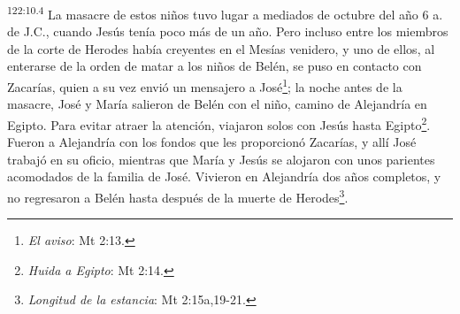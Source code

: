 \par 
\textsuperscript{122:10.4} La masacre de estos niños tuvo lugar a mediados de octubre del año 6 a. de J.C., cuando Jesús tenía poco más de un año. Pero incluso entre los miembros de la corte de Herodes había creyentes en el Mesías venidero, y uno de ellos, al enterarse de la orden de matar a los niños de Belén, se puso en contacto con Zacarías, quien a su vez envió un mensajero a José\footnote{\textit{El aviso}: Mt 2:13.}; la noche antes de la masacre, José y María salieron de Belén con el niño, camino de Alejandría en Egipto. Para evitar atraer la atención, viajaron solos con Jesús hasta Egipto\footnote{\textit{Huida a Egipto}: Mt 2:14.}. Fueron a Alejandría con los fondos que les proporcionó Zacarías, y allí José trabajó en su oficio, mientras que María y Jesús se alojaron con unos parientes acomodados de la familia de José. Vivieron en Alejandría dos años completos, y no regresaron a Belén hasta después de la muerte de Herodes\footnote{\textit{Longitud de la estancia}: Mt 2:15a,19-21.}.
